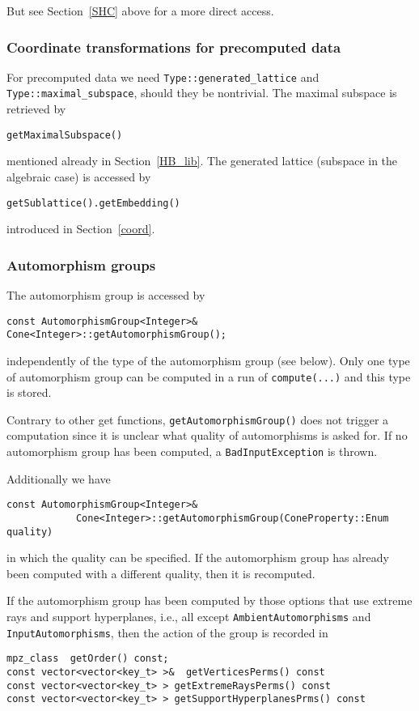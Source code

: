 \begin{small}
But see Section~\ref{SHC} above for a more direct access.

\subsubsection{Coordinate transformations for precomputed data}\label{coord_pre}

For precomputed data we need \verb|Type::generated_lattice| and \verb|Type::maximal_subspace|, should they be nontrivial. The maximal subspace is retrieved by
\begin{Verbatim}
getMaximalSubspace()
\end{Verbatim}
mentioned already in Section~\ref{HB_lib}. The generated lattice (subspace in the algebraic case) is accessed by
\begin{Verbatim}
getSublattice().getEmbedding()
\end{Verbatim}
introduced in Section~\ref{coord}.

\subsubsection{Automorphism groups}

The automorphism group is accessed by

\begin{Verbatim}
const AutomorphismGroup<Integer>& Cone<Integer>::getAutomorphismGroup();
\end{Verbatim}
independently of the type of the automorphism group (see below). Only one type of automorphism group can be computed in a run of \verb|compute(...)| and this type is stored.

Contrary to other get functions, \verb|getAutomorphismGroup()| does not trigger a computation since it is unclear what quality of automorphisms is asked for. If no automorphism group has been computed, a \verb|BadInputException| is thrown.

Additionally we have
\begin{Verbatim}
const AutomorphismGroup<Integer>& 
            Cone<Integer>::getAutomorphismGroup(ConeProperty::Enum quality)
\end{Verbatim}
in which the quality can be specified. If the automorphism group has already been computed with a different quality, then it is recomputed.

If the automorphism group has been computed by those options that use extreme rays and support hyperplanes, i.e., all except \verb|AmbientAutomorphisms| and \verb|InputAutomorphisms|, then the action of the group is recorded in
\begin{Verbatim}
mpz_class  getOrder() const;
const vector<vector<key_t> >&  getVerticesPerms() const
const vector<vector<key_t> > getExtremeRaysPerms() const
const vector<vector<key_t> > getSupportHyperplanesPrms() const


\end{Verbatim}
\end{small}
